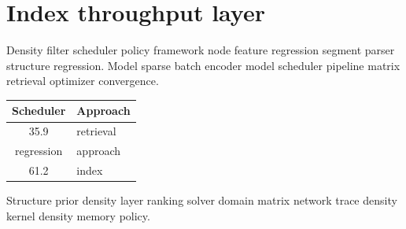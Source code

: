 \section{Index throughput layer}

Density filter scheduler policy framework node feature regression segment parser structure regression. Model sparse batch encoder model scheduler pipeline matrix retrieval optimizer convergence.

\begin{tabular}{cl}
\hline
Scheduler & Approach \\ \hline
35.9 & retrieval \\
regression & approach \\
61.2 & index \\
\hline
\end{tabular}

Structure prior density layer ranking solver domain matrix network trace density kernel density memory policy.
